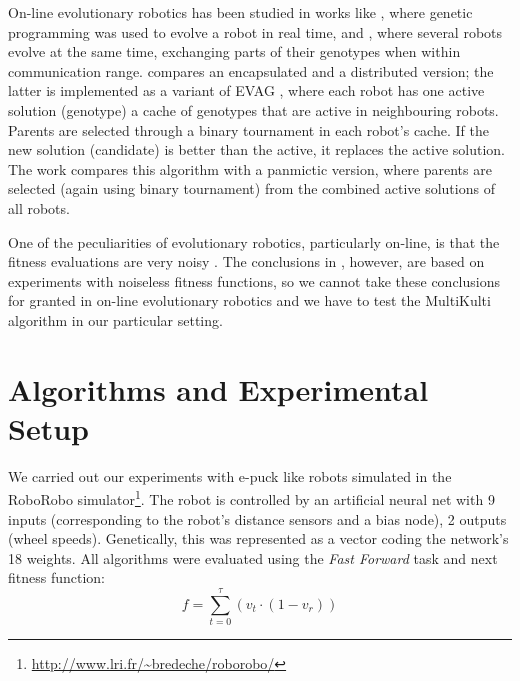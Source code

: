 \documentclass[runningheads]{llncs}
\begin{document}
On-line evolutionary robotics has been studied in works like \cite{nordin1997line}, where genetic programming was used to
evolve a robot in real time, and \cite{watson2002embodied}, where several robots evolve at the same time, exchanging parts of their genotypes when within communication range. 
\cite{HUIJSMAN11} compares an encapsulated and a distributed version; the latter is implemented as a variant of EVAG \cite{EVAG10}, where each robot has one active solution (genotype) a cache of genotypes that are active in neighbouring robots. Parents are selected through a binary tournament in each robot's cache. If the new solution (candidate) is better than the active, it replaces the active solution. 
The work compares this algorithm with a panmictic version, where parents are selected (again using binary tournament) from the combined active solutions of all robots.

One of the peculiarities of evolutionary robotics, particularly on-line, is that the fitness evaluations are very noisy \cite{Haasdijk2010On-line-evoluti}. 
The conclusions in \cite{MULTIKULTI11}, however, are based on experiments with noiseless fitness functions, so we cannot take these conclusions for granted in on-line evolutionary robotics and we have to test the MultiKulti algorithm in our particular setting.

\section{Algorithms and Experimental Setup}

We carried out our experiments with e-puck like robots simulated in the RoboRobo simulator\footnote{\url{http://www.lri.fr/~bredeche/roborobo/}}. The robot is controlled by an artificial neural net with 9 inputs (corresponding to the robot's distance sensors and a bias node), 2 outputs (wheel speeds). Genetically, this was represented as a vector coding the network's 18 weights. 
All algorithms were evaluated using the {\em Fast Forward} task and next fitness function: 
\vspace{-7pt}
\begin{equation}
\label{eq:fastfwd}
f = \sum_{t=0}^{\tau} (v_{t} \cdot (1 - v_{r}) )
\end{equation}
\vspace{-2pt} 
\end{document}
